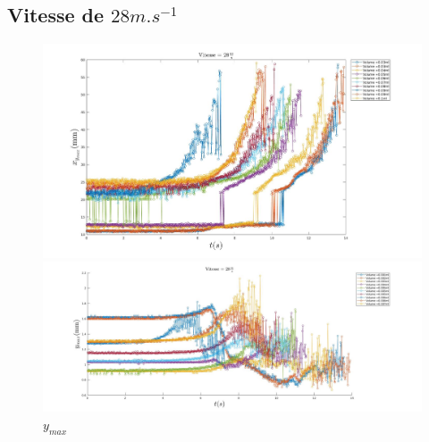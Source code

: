 \documentclass[french]{article}
\begin{document}
\subsection{Vitesse de $28m.s^{-1}$}

\begin{figure}[!h]
	\centering
	\begin{minipage}{0.95\linewidth}
	\includegraphics[width = \linewidth]{./image/v=28xm.jpg}
	\caption{$x_{max}$}
	\end{minipage}
	\begin{minipage}{0.95\linewidth}
	\includegraphics[width = \linewidth]{./image/v=28ym.jpg}
	\caption{$y_{max}$}
	\end{minipage}
\end{figure}
\end{document}
